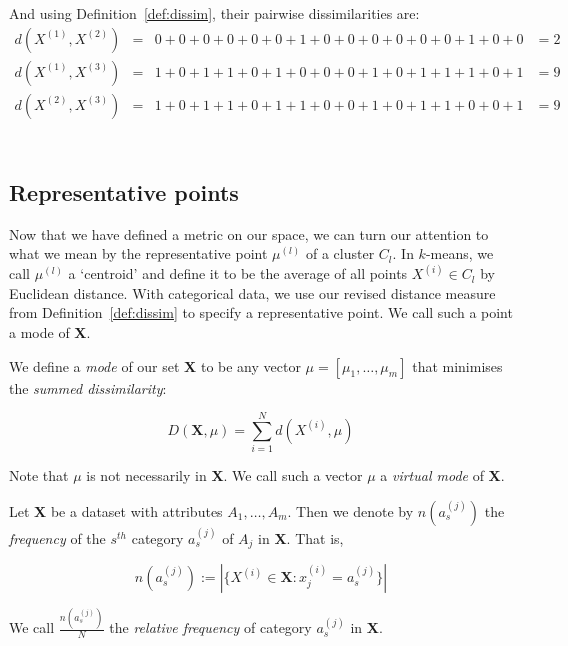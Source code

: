 \begin{example}
    And using Definition~\ref{def:dissim}, their pairwise dissimilarities are:
    \begin{equation}
    \nonumber
    \begin{aligned}
        d(X^{(1)}, X^{(2)}) & = & 0 + 0 + 0 + 0 + 0 + 0 + 1 + 0 + 0 + 0 + 0 + 0 
        + 0 + 1 + 0 + 0 & = 2
        \\
        d(X^{(1)}, X^{(3)}) & = & 1 + 0 + 1 + 1 + 0 + 1 + 0 + 0 + 0 + 1 + 0 + 1 
        + 1 + 1 + 0 + 1 & = 9
        \\
        d(X^{(2)}, X^{(3)}) & = & 1 + 0 + 1 + 1 + 0 + 1 + 1 + 0 + 0 + 1 + 0 + 1
        + 1 + 0 + 0 + 1 & = 9
        \\
    \end{aligned}
    \end{equation}
    \\
\end{example}

\subsection{Representative points}\label{subsec:rep-points}

Now that we have defined a metric on our space, we can turn our attention to 
what we mean by the representative point \(\mu^{(l)}\) of a cluster \(C_l\). In 
\(k\)-means, we call \(\mu^{(l)}\) a `centroid' and define it to be the average 
of all points \(X^{(i)} \in C_l\) by Euclidean distance. With categorical data, 
we use our revised distance measure from Definition~\ref{def:dissim} to specify 
a representative point. We call such a point a mode of \textbf{X}.\\

\begin{definition}\label{def:mode}
    We define a \emph{mode} of our set \textbf{X} to be any vector \(\mu = 
    [\mu_1, \ldots, \mu_m]\) that minimises the \emph{summed dissimilarity}:
	
    \begin{equation}
        D(\textbf{X}, \mu) = \sum_{i=1}^{N} d(X^{(i)}, \mu)
	\end{equation}
	
    Note that \(\mu\) is not necessarily in \textbf{X}. We call such a vector
    \(\mu\) a \emph{virtual mode} of \textbf{X}.
\end{definition}

\begin{definition}\label{def:rel-freq}
    Let \textbf{X} be a dataset with attributes \(A_1, \ldots, A_m\). Then we
    denote by \(n(a_s^{(j)})\) the \emph{frequency} of the \(s^{th}\) category 
    \(a_s^{(j)}\) of \(A_j\) in \textbf{X}. That is, 
	
    \[
	    n(a_s^{(j)}) := |{\{X^{(i)} \in \textbf{X}: x_j^{(i)} = a_s^{(j)}\}}|
	\]
	
    We call \(\frac{n(a_s^{(j)})}{N}\) the \emph{relative frequency} of category 
    \(a_s^{(j)}\) in \textbf{X}.
\end{definition}

